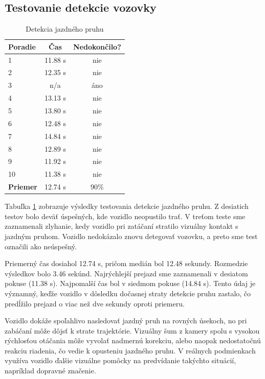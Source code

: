 \subsection{Testovanie detekcie vozovky}
\setcounter{table}{0}
\begin{table}[!ht]
\caption{Detekcia jazdného pruhu}
\label{tab:detekcia}
\centering
\begin{tabular}{ | l | c | c | }
	\hline
	\textbf{Poradie} & \textbf{Čas} & \textbf{Nedokončilo?} \\
	\hline
	1 & 11.88 s & nie \\
	2 & 12.35 s & nie \\
	3 & n/a	& áno \\
	4 & 13.13 s & nie \\
	5 & 13.80 s & nie \\
	6 & 12.48 s & nie \\
	7 & 14.84 s & nie \\
	8 & 12.89 s & nie \\
	9 & 11.92 s & nie \\
	10 & 11.38 s &	nie \\
	\hline
	\textbf{Priemer} & 12.74 s & 90\% \\
	\hline
\end{tabular}
\end{table}
Tabuľka \ref{tab:detekcia} zobrazuje výsledky testovania detekcie jazdného pruhu. Z desiatich testov bolo deväť úspešných, kde vozidlo neopustilo trať. V treťom teste sme zaznamenali zlyhanie, kedy vozidlo pri zatáčaní stratilo vizuálny kontakt s jazdným pruhom. Vozidlo nedokázalo znovu detegovať vozovku, a preto sme test označili ako neúspešný.\par
Priemerný čas dosiahol 12.74 s, pričom medián bol 12.48 sekundy. Rozmedzie výsledkov bolo 3.46 sekúnd. Najrýchlejší prejazd sme zaznamenali v desiatom pokuse (11.38 s). Najpomalší čas bol v siedmom pokuse (14.84 s). Tento údaj je významný, keďže vozidlo v dôsledku dočasnej straty detekcie pruhu zastalo, čo predĺžilo prejazd o viac než dve sekundy oproti priemeru.\par
Vozidlo dokáže spoľahlivo nasledovať jazdný pruh na rovných úsekoch, no pri zabáčaní môže dôjsť k strate trajektórie. Vizuálny šum z kamery spolu s vysokou rýchlosťou otáčania môže vyvolať nadmernú korekciu, alebo naopak nedostatočnú reakciu riadenia, čo vedie k opusteniu jazdného pruhu. V reálnych podmienkach využíva vozidlo ďalšie vizuálne pomôcky na predvídanie takýchto situácií, napríklad dopravné značenie.
